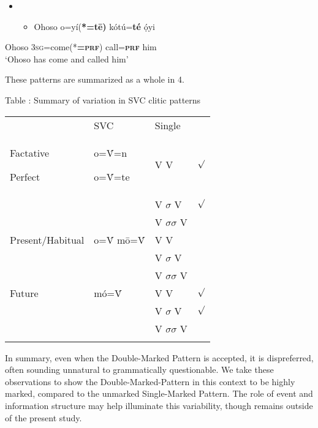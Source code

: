 \documentclass[output=paper]{langsci/langscibook}
\begin{document}
\begin{itemize}
\item \setcounter{itemize}{0}
\begin{itemize}
\item \gll Ohoso  o=yí(\textbf{*=t\={e})}      kótú=\textbf{té}    ọ́yi\\
\end{itemize}
\end{itemize}
       Ohoso  \textsc{3sg}=come(*\textbf{=}\textbf{\textsc{prf}})  call=\textbf{\textsc{prf  }}  him\\
\glt ‘Ohoso has come and called him’ \citep[285]{Kari2003a}
\z

These patterns are summarized as a whole in 4.

\begin{stylelsTableHeading}
\label{bkm:Ref448139790}Table : Summary of variation in SVC clitic patterns
\end{stylelsTableHeading}

\begin{tabularx}{\textwidth}{XXXX}
\lsptoprule

\multicolumn{2}{X}{} & {\mdseries SVC } & {\mdseries Single}\\
{\mdseries Factative}

{\mdseries Perfect} & {\mdseries o=\'{V}=n}

{\mdseries o=\'{V}=te} & {\mdseries V V} & {\mdseries ${\surd}$}\\
\hhline{--~~} &  & {\mdseries V $\sigma $ V} & {\mdseries ${\surd}$}\\
&  & {\mdseries V $\sigma \sigma $ V} & {\mdseries *}\\
{\mdseries Present/Habitual} & {\mdseries o=\'{V} m\={o}=\'{V}} & {\mdseries V V} & {\mdseries *}\\
&  & {\mdseries V $\sigma $ V} & {\mdseries *}\\
&  & {\mdseries V $\sigma \sigma $ V} & {\mdseries *}\\
{\mdseries Future} & {\mdseries mó=\'{V}} & {\mdseries V V} & {\mdseries ${\surd}$}\\
\hhline{--~~} &  & {\mdseries V $\sigma $ V} & {\mdseries ${\surd}$}\\
&  & {\mdseries V $\sigma \sigma $ V} & {\mdseries *}\\
\hhline{~~--}
\lspbottomrule
\end{tabularx}
In summary, even when the Double-Marked Pattern is accepted, it is dispreferred, often sounding unnatural to grammatically questionable. We take these observations to show the Double-Marked-Pattern in this context to be highly marked, compared to the unmarked Single-Marked Pattern. The role of event and information structure may help illuminate this variability, though remains outside of the present study.
\end{document}
